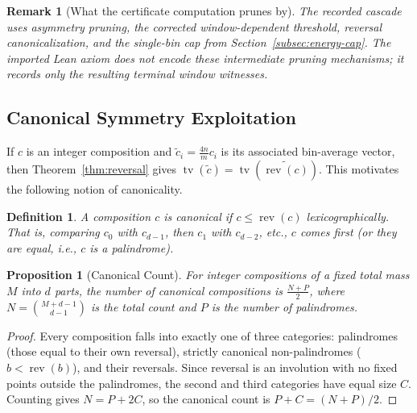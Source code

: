 \documentclass[11pt, letterpaper]{article}
\theoremstyle{paperplain}
\newtheorem{proposition}[theorem]{Proposition}
\theoremstyle{paperdef}
\newtheorem{definition}[theorem]{Definition}
\newtheorem{remark}[theorem]{Remark}
\newcommand{\tv}{\operatorname{tv}}
\newcommand{\rev}{\operatorname{rev}}
\begin{document}
\begin{remark}[What the certificate computation prunes by]
The recorded cascade uses asymmetry pruning, the corrected
window-dependent threshold, reversal canonicalization, and the
single-bin cap from Section~\ref{subsec:energy-cap}.  The imported Lean
axiom does not encode these intermediate pruning mechanisms; it records
only the resulting terminal window witnesses.
\end{remark}

\subsection{Canonical Symmetry Exploitation}

If $c$ is an integer composition and
$\tilde c_i = \tfrac{4n}{m}c_i$ is its associated bin-average vector,
then Theorem~\ref{thm:reversal} gives
$\tv(\tilde c) = \tv(\widetilde{\rev(c)})$.  This motivates the
following notion of canonicality.

\begin{definition}
A composition $c$ is \emph{canonical} if $c \le \rev(c)$
lexicographically.  That is, comparing $c_0$ with $c_{d-1}$, then
$c_1$ with $c_{d-2}$, etc., $c$ comes first (or they are equal, i.e.,
$c$ is a palindrome).
\end{definition}

\begin{proposition}[Canonical Count]
\label{prop:canon-count}
For integer compositions of a fixed total mass $M$ into $d$ parts, the
number of canonical compositions is $\tfrac{N + P}{2}$, where
$N = \binom{M+d-1}{d-1}$ is the total count and $P$ is the number of
palindromes.
\end{proposition}

\begin{proof}
Every composition falls into exactly one of three categories:
palindromes (those equal to their own reversal), strictly canonical
non-palindromes ($b < \rev(b)$), and their reversals.  Since reversal
is an involution with no fixed points outside the palindromes, the
second and third categories have equal size $C$.  Counting gives
$N = P + 2C$, so the canonical count is $P + C = (N+P)/2$.
\end{proof}
\end{document}
